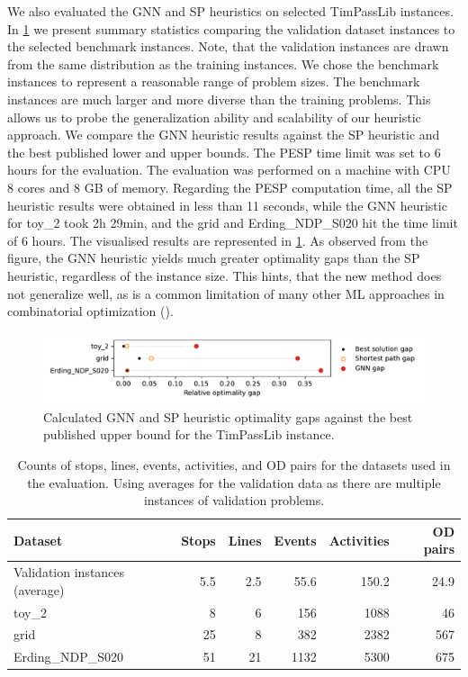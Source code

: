 \documentclass[english, 12pt, a4paper, sci, utf8, a-2b, online]{aaltothesis}
\begin{document}
We also evaluated the GNN and SP heuristics on selected TimPassLib instances. In \cref{tab:dataset-summary-stats} we present summary statistics comparing the validation dataset instances to the selected benchmark instances. Note, that the validation instances are drawn from the same distribution as the training instances. We chose the benchmark instances to represent a reasonable range of problem sizes. The benchmark instances are much larger and more diverse than the training problems. This allows us to probe the generalization ability and scalability of our heuristic approach. We compare the GNN heuristic results against the SP heuristic and the best published lower and upper bounds. The PESP time limit was set to 6 hours for the evaluation. The evaluation was performed on a machine with CPU 8 cores and 8 GB of memory. Regarding the PESP computation time, all the SP heuristic results were obtained in less than 11 seconds, while the GNN heuristic for toy\_2 took 2h 29min, and the grid and Erding\_NDP\_S020 hit the time limit of 6 hours. The visualised results are represented in \cref{fig:eval-timpasslib}. As observed from the figure, the GNN heuristic yields much greater optimality gaps than the SP heuristic, regardless of the instance size. This hints, that the new method does not generalize well, as is a common limitation of many other ML approaches in combinatorial optimization (\cite{cappart2023combinatorial}).
    

\begin{figure}[t]
    \centering
    \includegraphics[width=\linewidth]{figures/eval-timpasslib.pdf}
    \caption{Calculated GNN and SP heuristic optimality gaps against the best published upper bound for the TimPassLib instance.}
    \label{fig:eval-timpasslib}
\end{figure}


\begin{table}[] %
    \centering
    \caption{Counts of stops, lines, events, activities, and OD pairs for the datasets used in the evaluation. Using averages for the validation data as there are multiple instances of validation problems.}
    \label{tab:dataset-summary-stats}
    \begin{tabular}{l|rrrrr}
    Dataset                 & Stops & Lines & Events & Activities & OD pairs \\ \hline
    Validation instances (average) & 5.5   & 2.5   & 55.6   & 150.2      & 24.9     \\
    toy\_2                   & 8     & 6     & 156    & 1088       & 46       \\
    grid                    & 25    & 8     & 382    & 2382       & 567      \\
    Erding\_NDP\_S020         & 51    & 21    & 1132   & 5300       & 675     
    \end{tabular}
\end{table}
\end{document}
